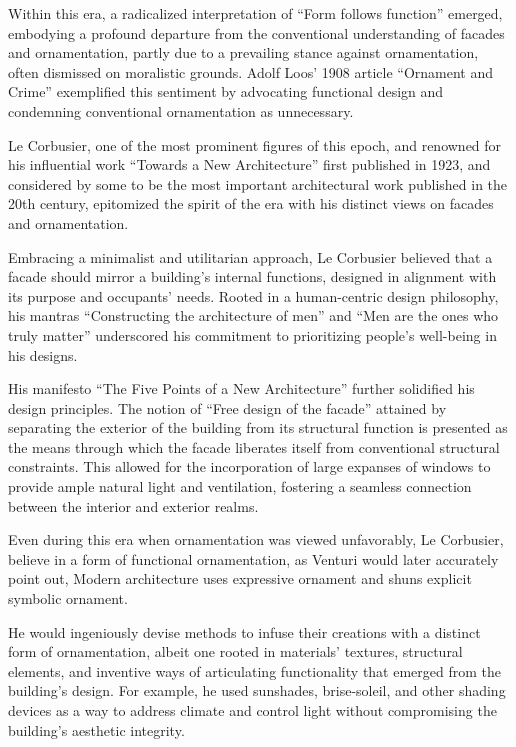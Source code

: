  Within this era, a radicalized interpretation of ``Form follows function'' emerged, embodying a profound departure from the conventional understanding of facades and ornamentation, partly due to a prevailing stance against ornamentation, often dismissed on moralistic grounds.
Adolf Loos' 1908 article ``Ornament and Crime'' exemplified this sentiment by advocating functional design and condemning conventional ornamentation as unnecessary\cite{Saglam2014}.

Le Corbusier, one of the most prominent figures of this epoch, and renowned for his influential work ``Towards a New Architecture'' first published in 1923, and considered by some to be the most important architectural work published in the 20th century, epitomized the spirit of the era with his distinct views on facades and ornamentation\cite{Studio2a2023}.

Embracing a minimalist and utilitarian approach, Le Corbusier believed that a facade should mirror a building's internal functions, designed in alignment with its purpose and occupants' needs.
Rooted in a human-centric design philosophy, his mantras ``Constructing the architecture of men'' and ``Men are the ones who truly matter'' underscored his commitment to prioritizing people's well-being in his designs\cite{Virseda2021}.

His manifesto ``The Five Points of a New Architecture'' further solidified his design principles\cite{Corbusier1986}.
The notion of ``Free design of the facade'' attained by separating the exterior of the building from its structural function is presented as the means through which the facade liberates itself from conventional structural constraints.
This allowed for the incorporation of large expanses of windows to provide ample natural light and ventilation, fostering a seamless connection between the interior and exterior realms.

Even during this era when ornamentation was viewed unfavorably, Le Corbusier, believe in a form of functional ornamentation, as Venturi\cite{Venturi1972} would later accurately point out, Modern architecture uses expressive ornament and shuns explicit symbolic  ornament.

He would ingeniously devise methods to infuse their creations with a distinct form of ornamentation, albeit one rooted in materials' textures, structural elements, and inventive ways of articulating functionality\cite{Saglam2014} that emerged from the building's design.
For example, he used sunshades, brise-soleil, and other shading devices as a way to address climate and control light without compromising the building's aesthetic integrity.


